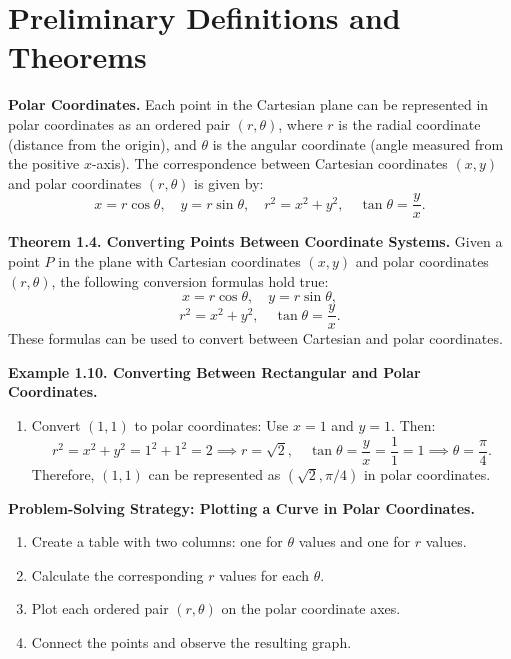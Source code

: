 \documentclass{article}
\begin{document}
\renewcommand{\familydefault}{\rmdefault}




\section*{Preliminary Definitions and Theorems}

\begin{definitionbox}
\textbf{Polar Coordinates.}  
Each point in the Cartesian plane can be represented in polar coordinates as an ordered pair $(r, \theta)$, where $r$ is the radial coordinate (distance from the origin), and $\theta$ is the angular coordinate (angle measured from the positive $x$-axis).  
The correspondence between Cartesian coordinates $(x, y)$ and polar coordinates $(r, \theta)$ is given by:
\[
x = r\cos\theta, \quad y = r\sin\theta, \quad r^2 = x^2 + y^2, \quad \tan\theta = \frac{y}{x}.
\]
\end{definitionbox}

\begin{theorembox}
\textbf{Theorem 1.4. Converting Points Between Coordinate Systems.}  
Given a point $P$ in the plane with Cartesian coordinates $(x, y)$ and polar coordinates $(r, \theta)$, the following conversion formulas hold true:
\[
x = r\cos\theta, \quad y = r\sin\theta,
\]
\[
r^2 = x^2 + y^2, \quad \tan\theta = \frac{y}{x}.
\]
These formulas can be used to convert between Cartesian and polar coordinates.
\end{theorembox}

\begin{examplebox}
\textbf{Example 1.10. Converting Between Rectangular and Polar Coordinates.}
\begin{enumerate}
    \item Convert $(1, 1)$ to polar coordinates:  
    Use $x = 1$ and $y = 1$. Then:
    \[
    r^2 = x^2 + y^2 = 1^2 + 1^2 = 2 \implies r = \sqrt{2}, \quad \tan\theta = \frac{y}{x} = \frac{1}{1} = 1 \implies \theta = \frac{\pi}{4}.
    \]
    Therefore, $(1, 1)$ can be represented as $(\sqrt{2}, \pi/4)$ in polar coordinates.
\end{enumerate}
\end{examplebox}

\begin{conceptbox}
\textbf{Problem-Solving Strategy: Plotting a Curve in Polar Coordinates.}
\begin{enumerate}
    \item Create a table with two columns: one for $\theta$ values and one for $r$ values.
    \item Calculate the corresponding $r$ values for each $\theta$.
    \item Plot each ordered pair $(r, \theta)$ on the polar coordinate axes.
    \item Connect the points and observe the resulting graph.
\end{enumerate}
\end{conceptbox}
\end{document}

